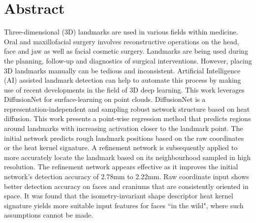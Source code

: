 \documentclass[class=article, crop=false]{standalone}
\begin{document}

\pagestyle{empty}


\section*{\centering Abstract}

Three-dimensional (3D) landmarks are used in various fields within medicine. Oral and maxillofacial surgery involves reconstructive operations on the head, face and jaw as well as facial cosmetic surgery. Landmarks are being used during the planning, follow-up and diagnostics of surgical interventions. However, placing 3D landmarks manually can be tedious and inconsistent. Artificial Intelligence (AI) assisted landmark detection can help to automate this process by making use of recent developments in the field of 3D deep learning.
This work leverages DiffusionNet for surface-learning on point clouds. DiffusionNet is a representation-independent and sampling robust network structure based on heat diffusion.
This work presents a point-wise regression method that predicts regions around landmarks with increasing activation closer to the landmark point. The initial network predicts rough landmark positions based on the raw coordinates or the heat kernel signature. A refinement network is subsequently applied to more accurately locate the landmark based on its neighbourhood sampled in high resolution. The refinement network appears effective as it improves the initial network's detection accuracy of 2.78mm to 2.22mm. Raw coordinate input shows better detection accuracy on faces and craniums that are consistently oriented in space. It was found that the isometry-invariant shape descriptor heat kernel signature yields more suitable input features for faces ``in the wild", where such assumptions cannot be made.


\noindent
\clearpage
\end{document}
